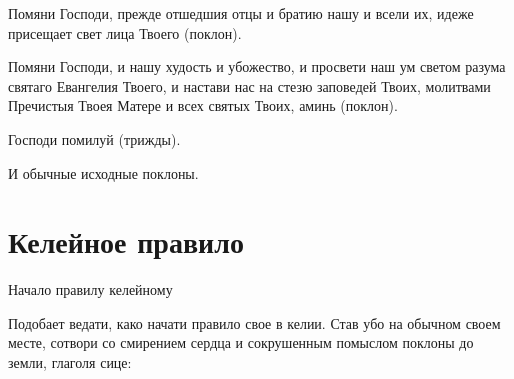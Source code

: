 Помяни Господи, прежде отшедшия отцы и братию нашу и всели их, идеже присещает свет лица Твоего (поклон).

Помяни Господи, и нашу худость и убожество, и просвети наш ум светом разума святаго Евангелия Твоего, и настави нас на стезю заповедей Твоих, молитвами Пречистыя Твоея Матере и всех святых Твоих, аминь (поклон).

Господи помилуй (трижды). 

И обычные исходные поклоны.


\section{Келейное правило}
 


Начало правилу келейному

Подобает ведати, како начати правило свое в келии. Став убо на обычном своем месте, сотвори со смирением сердца и сокрушенным помыслом поклоны до земли, глаголя сице:

